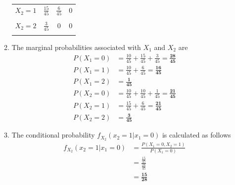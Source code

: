\documentclass{uofa-eng-assignment}
\begin{document}
\begin{enumerate}
\begin{enumerate}
\begin{center}
\begin{tabular}{|c|c|c|c|}
                          $X_2=1$ & $\frac{15}{45}$ & $\frac{6}{45}$  & 0              \\
                                  &                 &                 &                \\
                          $X_2=2$ & $\frac{3}{45}$  & 0               & 0              \\
                                  &                 &                 &                \\
                          \hline
                      \end{tabular}
                  \end{center}
            \item The marginal probabilities associated with $X_1$ and $X_2$ are
                  \begin{align*}
                      P(X_1 = 0) & = \frac{10}{45} + \frac{15}{45} + \frac{3}{45} = \boldsymbol{\frac{28}{45}} \\
                      P(X_1 = 1) & = \frac{10}{45} + \frac{6}{45} = \boldsymbol{\frac{16}{45}}                 \\
                      P(X_1 = 2) & = \boldsymbol{\frac{1}{45}}                                                 \\
                      P(X_2 = 0) & = \frac{10}{45} + \frac{10}{45} + \frac{1}{45} = \boldsymbol{\frac{21}{45}} \\
                      P(X_2 = 1) & = \frac{15}{45} + \frac{6}{45} = \boldsymbol{\frac{21}{45}}                 \\
                      P(X_2 = 2) & = \boldsymbol{\frac{3}{45}}
                  \end{align*}
            \item The conditional probability $f_{X_2}(x_2 = 1 | x_1 = 0)$ is calculated as
                  follows
                  \begin{align*}
                      f_{X_2}(x_2 = 1 | x_1 = 0) & = \frac{P(X_1 = 0, X_2 = 1)}{P(X_1 = 0)} \\
                                                 & = \frac{\frac{15}{45}}{\frac{28}{45}}    \\
                                                 & = \boldsymbol{\frac{15}{28}}
                  \end{align*}
        \end{enumerate}

\end{enumerate}
\end{document}
